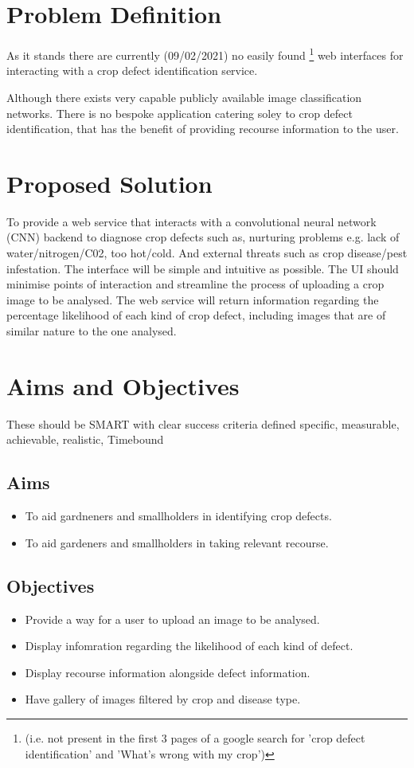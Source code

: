   \newpage


\section{Problem Definition}
  As it stands there are currently (09/02/2021) no easily found \footnote[1]{(i.e. not present in the first 3 pages of a google search for 'crop defect identification' and 'What's wrong with my crop')} web interfaces for interacting with a crop defect identification service.
  \par
  Although there exists very capable publicly available image classification networks. \cite{Yandex} There is no bespoke application catering soley to crop defect identification, that has the benefit of providing recourse information to the user.

\section{Proposed Solution}
  To provide a web service that interacts with a convolutional neural network (CNN) backend to diagnose crop defects such as, nurturing problems e.g. lack of water/nitrogen/C02, too hot/cold. And external threats such as crop disease/pest infestation. The interface will be simple and intuitive as possible. The UI should minimise points of interaction and streamline the process of uploading a crop image to be analysed.
	The web service will return information regarding the percentage likelihood of each kind of crop defect, including images that are of similar nature to the one analysed.

\section{Aims and Objectives}
  These should be SMART with clear success criteria defined
  specific, measurable, achievable, realistic, Timebound
  \subsection{Aims}
    \begin{itemize}
      \item To aid gardneners and smallholders in identifying crop defects.
      \item To aid gardeners and smallholders in taking relevant recourse.
    \end{itemize}
  \subsection{Objectives}
    \begin{itemize}
      \item Provide a way for a user to upload an image to be analysed.
      \item Display infomration regarding the likelihood of each kind of defect.
      \item Display recourse information alongside defect information.
      \item Have gallery of images filtered by crop and disease type.
    \end{itemize}

